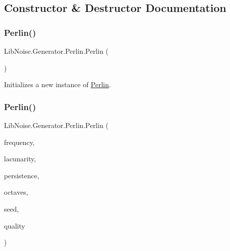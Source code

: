 \subsection{Constructor \& Destructor Documentation}
\mbox{\label{class_lib_noise_1_1_generator_1_1_perlin_a3602fdceebc6f930056880627e7c013e}} 
\subsubsection{\texorpdfstring{Perlin()}{Perlin()}\hspace{0.1cm}{\footnotesize\ttfamily [1/2]}}
{\footnotesize\ttfamily Lib\+Noise.\+Generator.\+Perlin.\+Perlin (\begin{DoxyParamCaption}{ }\end{DoxyParamCaption})}



Initializes a new instance of \hyperlink{class_lib_noise_1_1_generator_1_1_perlin}{Perlin}. 

\mbox{\label{class_lib_noise_1_1_generator_1_1_perlin_a0495e8f6b923ad4edd734a477594827e}} 
\subsubsection{\texorpdfstring{Perlin()}{Perlin()}\hspace{0.1cm}{\footnotesize\ttfamily [2/2]}}
{\footnotesize\ttfamily Lib\+Noise.\+Generator.\+Perlin.\+Perlin (\begin{DoxyParamCaption}\item[{double}]{frequency,  }\item[{double}]{lacunarity,  }\item[{double}]{persistence,  }\item[{int}]{octaves,  }\item[{int}]{seed,  }\item[{\hyperlink{namespace_lib_noise_ab253d2180e71b8b4b51e250163ca0e27}{Quality\+Mode}}]{quality }\end{DoxyParamCaption})}



